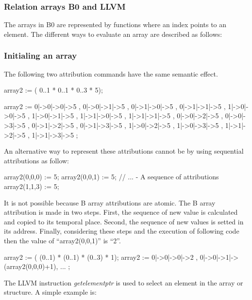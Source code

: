\subsubsection{Relation arrays B0 and LLVM}

The arrays in B0 are represented by functions where an index points to an 
element. The different ways to evaluate an array are described as follows:

\subsubsection{Initialing an array}
The following two attribution commands have the same semantic effect.
 
\begin{pascalcode}
array2 := ( 0..1 * 0..1 * 0..3 * {5});

array2 := { 0|->0|->0|->5 , 0|->0|->1|->5 , 
            0|->1|->0|->5 , 0|->1|->1|->5 , 
            1|->0|->0|->5 , 1|->0|->1|->5 , 
            1|->1|->0|->5 , 1|->1|->1|->5 ,
            0|->0|->2|->5 , 0|->0|->3|->5 ,
            0|->1|->2|->5 , 0|->1|->3|->5 , 
            1|->0|->2|->5 , 1|->0|->3|->5 , 
            1|->1|->2|->5 , 1|->1|->3|->5 };
\end{pascalcode}

An alternative way to represent these attributions cannot be by
using sequential attributions as follow:

\begin{pascalcode}
array2(0,0,0) := 5;
array2(0,0,1) := 5;
// ... - A sequence of attributions
array2(1,1,3) := 5;
\end{pascalcode}

It is not possible because B array attributions are atomic. The B array 
attribution is made in two steps. First, the sequence of new value is calculated and
copied to its temporal place. Second, the sequence of new values is setted 
in its address. Finally, considering these steps and the execution of
following code then the value of ``array2(0,0,1)'' is ``2''.

\begin{pascalcode}
 array2 := ( (0..1) * (0..1) * (0..3) * {1});
 array2 := { 0|->0|->0|->2 , 0|->0|->1|->(array2(0,0,0)+1), ...  };
\end{pascalcode}

The LLVM instruction \textit{getelementptr} is used to select an element in
the array or structure. A simple example is: 

\begin{llvmcode}
\end{llvmcode}


